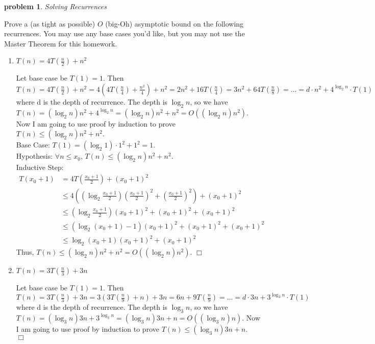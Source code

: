 \documentclass[10pt]{article}
\newenvironment{proof}{\par\noindent{\it Proof.}\hspace*{1em}}{$\Box$\bigskip}
\newtheorem{problem}{\sc\color{cit}problem}
\begin{document}
\newpage
\begin{problem} Solving Recurrences \end{problem}
Prove a (as tight as possible) $O$ (big-Oh) asymptotic bound on the following recurrences. You may use any base cases you'd like, but you may not use the Master Theorem for this homework.
\begin{enumerate}
    \item $T(n) = 4 T(\frac{n}{2}) + n^2$
    \begin{proof}
    Let base case be $T(1)=1$. Then $T(n) = 4 T(\frac{n}{2}) + n^2 = 4( 4T(\frac{n}{4})+\frac{n^2}{4}) + n^2 = 2n^2+16T(\frac{n}{4}) = 3n^2+64T(\frac{n}{8})=...=d\cdot n^2+4^{\log_2 n}\cdot T(1)$ where d is the depth of recurrence. The depth is $\log_2 n$, so we have $T(n) = (\log_2 n)n^2 + 4^{\log_2 n}=(\log_2 n)n^2 + n^2 = O((\log_2 n)n^2)$. \\
    Now I am going to use proof by induction to prove $T(n) \leq (\log_2 n)n^2 + n^2$. \\
    Base Case: $T(1)= (\log_2 1)\cdot 1^2 + 1^2 = 1$.\\
    Hypothesis: $\forall n \leq x_0$, $T(n) \leq (\log_2 n)n^2 + n^2$.\\
    Inductive Step: 
    \begin{align}
        T(x_0+1)&=4T(\frac{x_0+1}{2})+(x_0+1)^2\\
                &\leq 4((\log_2 {\frac{x_0+1}{2}}){(\frac{x_0+1}{2})}^2 + {(\frac{x_0+1}{2})}^2)+(x_0+1)^2\\
                &\leq (\log_2 {\frac{x_0+1}{2}}){(x_0+1)}^2 + {(x_0+1)}^2+(x_0+1)^2\\
                &\leq (\log_2 (x_0+1)-1){(x_0+1)}^2 + {(x_0+1)}^2+(x_0+1)^2\\
                &\leq \log_2 (x_0+1){(x_0+1)}^2 + (x_0+1)^2
    \end{align}
    Thus, $T(n) \leq (\log_2 n)n^2 + n^2= O((\log_2 n)n^2)$.
    \end{proof}
    \item $T(n) = 3 T(\frac{n}{3}) + 3n$
    \begin{proof}
    Let base case be $T(1)=1$. Then $T(n) = 3 T(\frac{n}{3}) + 3n = 3( 3T(\frac{n}{9})+n) + 3n = 6n+9T(\frac{n}{9})=...=d\cdot 3n+3^{\log_3 n}\cdot T(1)$ where d is the depth of recurrence. The depth is $\log_3 n$, so we have $T(n) = (\log_3 n)3n + 3^{\log_3 n} = (\log_3 n)3n+n = O((\log_3 n)n)$.
    Now I am going to use proof by induction to prove $T(n) \leq (\log_3 n)3n + n$. \\

\end{proof}
\end{enumerate}
\end{document}
